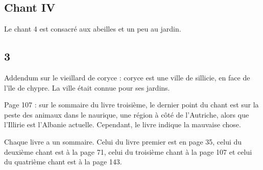 \documentclass[a4paper,12pt]{book}
\begin{document}
\subsection{Chant IV}
Le chant 4 est consacré aux abeilles et un peu au jardin.


\subsection{3}
\par Addendum sur le vieillard de coryce : coryce est une ville de sillicie, en face de l'île de chypre. La ville était connue pour ses jardins.
\par Page 107 : sur le sommaire du livre troisième, le dernier point du chant est sur la peste des animaux dans le naurique, une région à côté de l'Autriche, alors que l'Illirie est l'Albanie actuelle. Cependant, le livre indique la mauvaise chose.
\par Chaque livre a un sommaire. Celui du livre premier est en page 35, celui du deuxième chant est à la page 71, celui du troisième chant à la page 107 et celui du quatrième chant est à la page 143.
\end{document}
